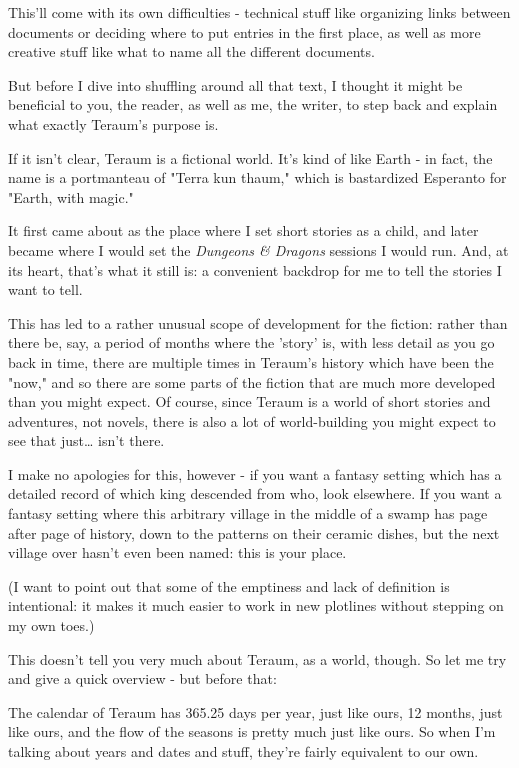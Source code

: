 \documentclass[11pt]{article}
\begin{document}
This'll come with its own difficulties - technical stuff like
organizing links between documents or deciding where to put entries in
the first place, as well as more creative stuff like what to name all
the different documents.

But before I dive into shuffling around all that text, I thought it
might be beneficial to you, the reader, as well as me, the writer, to
step back and explain what exactly Teraum's purpose is.

If it isn't clear, Teraum is a fictional world. It's kind of like
Earth - in fact, the name is a portmanteau of "Terra kun thaum," which
is bastardized Esperanto for "Earth, with magic."

It first came about as the place where I set short stories as a child,
and later became where I would set the \emph{Dungeons \& Dragons} sessions I
would run. And, at its heart, that's what it still is: a convenient
backdrop for me to tell the stories I want to tell.

This has led to a rather unusual scope of development for the fiction:
rather than there be, say, a period of months where the 'story' is,
with less detail as you go back in time, there are multiple times in
Teraum's history which have been the "now," and so there are some
parts of the fiction that are much more developed than you might
expect. Of course, since Teraum is a world of short stories and
adventures, not novels, there is also a lot of world-building you
might expect to see that just\ldots{} isn't there.

I make no apologies for this, however - if you want a fantasy setting
which has a detailed record of which king descended from who, look
elsewhere. If you want a fantasy setting where this arbitrary village
in the middle of a swamp has page after page of history, down to the
patterns on their ceramic dishes, but the next village over hasn't
even been named: this is your place.

(I want to point out that some of the emptiness and lack of definition
is intentional: it makes it much easier to work in new plotlines
without stepping on my own toes.)

This doesn't tell you very much about Teraum, as a world, though. So
let me try and give a quick overview - but before that:

The calendar of Teraum has 365.25 days per year, just like ours, 12
months, just like ours, and the flow of the seasons is pretty much
just like ours. So when I'm talking about years and dates and stuff,
they're fairly equivalent to our own.
\end{document}

